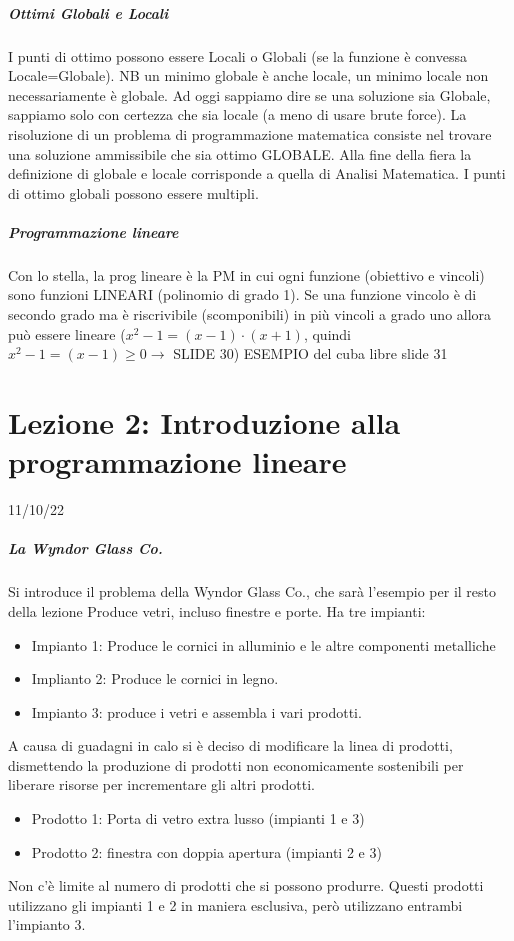 \documentclass[12pt, a4paper, openany]{book}
\begin{document}
\paragraph*{Ottimi Globali e Locali} I punti di ottimo possono essere Locali o Globali (se la funzione è convessa Locale=Globale). NB un minimo globale è anche locale, un minimo locale non necessariamente è globale.
Ad oggi sappiamo dire se una soluzione sia Globale, sappiamo solo con certezza che sia locale (a meno di usare brute force).
La risoluzione di un problema di programmazione matematica consiste nel trovare una soluzione ammissibile che sia ottimo GLOBALE.
Alla fine della fiera la definizione di globale e locale corrisponde a quella di Analisi Matematica.
I punti di ottimo globali possono essere multipli.

\paragraph*{Programmazione lineare} Con lo stella, la prog lineare è la PM in cui ogni funzione (obiettivo e vincoli) sono funzioni LINEARI (polinomio di grado 1).
Se una funzione vincolo è di secondo grado ma è riscrivibile (scomponibili) in più vincoli a grado uno allora può essere lineare ($x^2-1 =(x-1) \cdot (x+1)$, quindi $x^2-1 =(x-1) \geq 0 \to $ {SLIDE 30})
{ESEMPIO del cuba libre slide 31}

\chapter{Lezione 2: Introduzione alla programmazione lineare} 11/10/22
\paragraph*{La Wyndor Glass Co.} Si introduce il problema della Wyndor Glass Co., che sarà l'esempio per il resto della lezione
Produce vetri, incluso finestre e porte.
Ha tre impianti:
\begin{itemize}
    \item Impianto 1: Produce le cornici in alluminio e le altre componenti metalliche
    \item Implianto 2: Produce le cornici in legno.
    \item Impianto 3: produce i vetri e assembla i vari prodotti.
\end{itemize}
A causa di guadagni in calo si è deciso di modificare la linea di prodotti, dismettendo la produzione di prodotti non economicamente sostenibili per liberare risorse
per incrementare gli altri prodotti.
\begin{itemize}
    \item Prodotto 1: Porta di vetro extra lusso (impianti 1 e 3)
    \item Prodotto 2: finestra con doppia apertura (impianti 2 e 3)
\end{itemize}
Non c'è limite al numero di prodotti che si possono produrre.
Questi prodotti utilizzano gli impianti 1 e 2 in maniera esclusiva, però utilizzano entrambi l'impianto 3.
\end{document}
